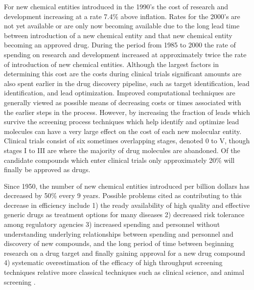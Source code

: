 For new chemical entities introduced in the 1990's the cost of research and development increasing at a rate 7.4\% above inflation.
Rates for the 2000's are not yet available or are only now becoming available due to the long lead time between introduction of a new chemical entity and that new chemical entity becoming an approved drug.
During the period from 1985 to 2000 the rate of spending on research and development increased at approximately twice the rate of introduction of new chemical entities.
Although the largest factors in determining this cost are the costs during clinical trials significant amounts are also spent earlier in the drug discovery pipeline, such as target identification, lead identification, and lead optimization.
Improved computational techniques are generally viewed as possible means of decreasing costs or times associated with the earlier steps in the process.
However, by increasing the fraction of leads which survive the screening process techniques which help identify and optimize lead molecules can have a very large effect on the cost of each new molecular entity.
Clinical trials consist of six sometimes overlapping stages, denoted 0 to V, though stages I to III are where the majority of drug molecules are abandoned.
Of the candidate compounds which enter clinical trials only approximately 20\% will finally be approved as drugs.
\cite{dimasi2003price}

Since 1950, the number of new chemical entities introduced per billion dollars has decreased by 50\% every 9 years.
Possible problems cited as contributing to this decrease in efficiency include
1) the ready availability of high quality and effective generic drugs as treatment options for many diseases
2) decreased risk tolerance among regulatory agencies
3) increased spending and personnel without understanding underlying relationships between spending and personnel and discovery of new compounds, and the long period of time between beginning research on a drug target and finally gaining approval for a new drug compound
4) systematic overestimation of the efficacy of high throughput screening techniques relative more classical techniques such as clinical science, and animal screening 
\cite{scannell2012diagnosing}.


